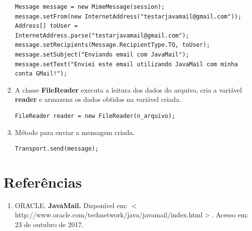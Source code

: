 \documentclass[14pt, a4paper]{article}
\begin{document}
\begin{enumerate}
\begin{lstlisting}
Message message = new MimeMessage(session);
message.setFrom(new InternetAddress("testarjavamail@gmail.com"));
Address[] toUser = InternetAddress.parse("testarjavamail@gmail.com");  
message.setRecipients(Message.RecipientType.TO, toUser);
message.setSubject("Enviando email com JavaMail");
message.setText("Enviei este email utilizando JavaMail com minha conta GMail!");

\end{lstlisting}                    

\item A classe \textbf{FileReader} executa a leitura dos dados do arquivo, cria a variável \textbf{reader} e armazena os dados obtidos na variável criada.

\begin{lstlisting}                    
FileReader reader = new FileReader(n_arquivo);
\end{lstlisting}                                        

\item Método para enviar a mensagem criada.

\begin{lstlisting}
Transport.send(message);
\end{lstlisting}                                        

\end{enumerate}

\section{Referências}
\begin{enumerate}

\item ORACLE. \textbf{JavaMail.} Disponível em: $<$http://www.oracle.com/technetwork/java/javamail/index.html$>$. Acesso em: 23 de outubro de 2017.

\end{enumerate}
\end{document}
